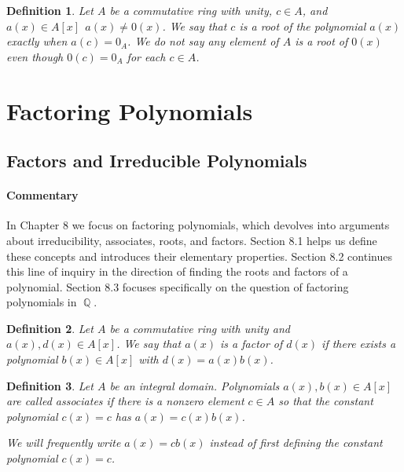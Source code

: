 \documentclass[letterpaper, 12pt]{article}
\DeclareMathOperator{\Q}{\mathbb{Q}}
\newtheorem{defn}{Definition}
\begin{document}
			\setcounter{defn}{36}
			\begin{defn}
			Let $A$ be a commutative ring with unity, $c \in A$, and $a(x) \in A[x] \ \ a(x) \neq 0(x)$.
			We say that $c$ is a root of the polynomial $a(x)$ exactly when $a(c) = 0_{A}$. 
			We do not say any element of $A$ is a root of $0(x)$ even though $0(c) = 0_{A}$ for each $c \in A$.
			\end{defn}

	\section{Factoring Polynomials}
	\label{sec:factoring_polynomials}
		\subsection{Factors and Irreducible Polynomials}
		\label{sec:factors_and_irreducible_polynomials}
			\paragraph{\color{blue}Commentary}
			\color{blue}
			In Chapter 8 we focus on factoring polynomials, which devolves into arguments about irreducibility, associates, roots, and factors.
			Section 8.1 helps us define these concepts and introduces their elementary properties.
			Section 8.2 continues this line of inquiry in the direction of finding the roots and factors of a polynomial.
			Section 8.3 focuses specifically on the question of factoring polynomials in $\Q$.
			\color{black}

			\setcounter{defn}{0}
			\setcounter{thm}{0}

			\begin{defn}
			Let $A$ be a commutative ring with unity and $a(x), d(x) \in A[x]$. 
			We say that $a(x)$ is a factor of $d(x)$ if there exists a polynomial $b(x) \in A[x]$ with $d(x) = a(x)b(x)$.
			\end{defn}

			\setcounter{defn}{3}
			\begin{defn}
			Let $A$ be an integral domain. 
			Polynomials $a(x),b(x) \in A[x]$ are called associates if there is a nonzero element $c \in A$ so that the constant polynomial $c(x) = c$ has $a(x) = c(x)b(x)$.
			
			We will frequently write $a(x) = cb(x)$ instead of first defining the constant polynomial $c(x) = c$.
			\end{defn}
\end{document}
